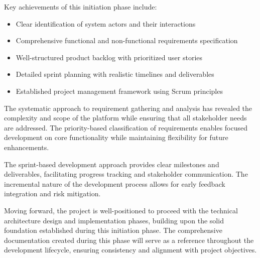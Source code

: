 Key achievements of this initiation phase include:
\begin{itemize}
    \item Clear identification of system actors and their interactions
    \item Comprehensive functional and non-functional requirements specification
    \item Well-structured product backlog with prioritized user stories
    \item Detailed sprint planning with realistic timelines and deliverables
    \item Established project management framework using Scrum principles
\end{itemize}

The systematic approach to requirement gathering and analysis has revealed the complexity and scope of the platform while ensuring that all stakeholder needs are addressed. The priority-based classification of requirements enables focused development on core functionality while maintaining flexibility for future enhancements.

The sprint-based development approach provides clear milestones and deliverables, facilitating progress tracking and stakeholder communication. The incremental nature of the development process allows for early feedback integration and risk mitigation.

Moving forward, the project is well-positioned to proceed with the technical architecture design and implementation phases, building upon the solid foundation established during this initiation phase. The comprehensive documentation created during this phase will serve as a reference throughout the development lifecycle, ensuring consistency and alignment with project objectives.